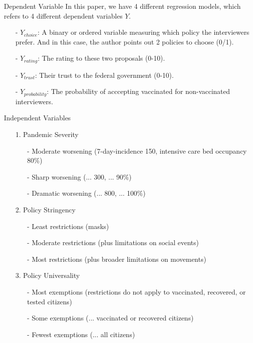 \documentclass{beamer}
\begin{document}
\begin{frame}{Dependent Variable}
	\noindent In this paper, we have 4 different regression models, which refers to 4 different dependent variables $Y$.
	\par
	\begin{itemize}
		\item[-] $Y_{choice}$: A binary or ordered variable measuring which policy the interviewers prefer. And in this case, the author points out 2 policies to choose (0/1).
		\item[-] $Y_{rating}$: The rating to these two proposals (0-10).
		\item[-] $Y_{trust}$: Their trust to the federal government (0-10).
		\item[-] $Y_{probability}$: The probability of acccepting vaccinated for non-vaccinated interviewers. 
	\end{itemize}
\end{frame}

\begin{frame}{Independent Variables}
\begin{itemize}
	\item[1.] Pandemic Severity
	\begin{enumerate}
		\item[-] Moderate worsening (7-day-incidence 150, intensive care bed occupancy 80\%)
		\item[-] Sharp worsening (... 300, ... 90\%)
		\item[-] Dramatic worsening (... 800, ... 100\%)
	\end{enumerate}
	\item[2.] Policy Stringency
	\begin{enumerate}
		\item[-]  Least restrictions (masks)
		\item[-]  Moderate restrictions (plus limitations on social events)
		\item[-]  Most restrictions (plus broader limitations on movements)
	\end{enumerate}
	\item[3.] Policy Universality
	\begin{enumerate}
		\item[-] Most exemptions (restrictions do not apply to vaccinated, recovered, or tested citizens)
		\item[-] Some exemptions (... vaccinated or recovered citizens)
		\item[-] Fewest exemptions (... all citizens)
	\end{enumerate}
\end{itemize}
\end{frame}
\end{document}
